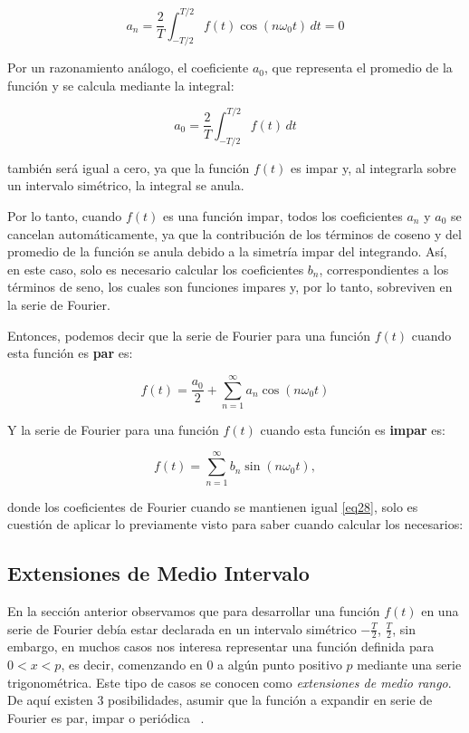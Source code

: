 \[
a_n = \frac{2}{T} \int_{-T/2}^{T/2} f(t) \cos(n \omega_0 t) \, dt = 0
\]

Por un razonamiento análogo, el coeficiente \( a_0 \), que representa el promedio de la función y se calcula mediante la integral:

\[
a_0 = \frac{2}{T} \int_{-T/2}^{T/2} f(t) \, dt
\]

también será igual a cero, ya que la función \( f(t) \) es impar y, al integrarla sobre un intervalo simétrico, la integral se anula.

Por lo tanto, cuando \( f(t) \) es una función impar, todos los coeficientes \( a_n \) y \( a_0 \) se cancelan automáticamente, ya que la contribución de los términos de coseno y del promedio de la función se anula debido a la simetría impar del integrando. Así, en este caso, solo es necesario calcular los coeficientes \( b_n \), correspondientes a los términos de seno, los cuales son funciones impares y, por lo tanto, sobreviven en la serie de Fourier. \newline

Entonces, podemos decir que la serie de Fourier para una función $f(t)$ cuando esta función es \textbf{par} es:

\begin{equation}\label{eq30}
	f(t) = \frac{a_0}{2} + \sum_{n=1}^{\infty} a_n \cos(n\omega_0 t)
\end{equation}

Y la serie de Fourier para una función $f(t)$ cuando esta función es \textbf{impar} es:

\begin{equation}\label{eq31}
	f(t) =\sum_{n=1}^{\infty}  b_n \sin(n\omega_0 t),
\end{equation}

donde los coeficientes de Fourier cuando se mantienen igual \ref{eq28}, solo es cuestión de aplicar lo previamente visto para saber cuando calcular los necesarios:


\subsection{Extensiones de Medio Intervalo}
En la sección anterior observamos que para desarrollar una función $f(t)$ en una serie de Fourier debía estar declarada en un intervalo simétrico $-\frac{T}{2}$, $\frac{T}{2}$, sin embargo, en muchos casos nos interesa representar una función definida para $0 < x < p$, es decir, comenzando en 0 a algún punto positivo $p$ mediante una serie trigonométrica. Este tipo de casos se conocen como \textit{extensiones de medio rango}. De aquí existen 3 posibilidades, asumir que la función a expandir en serie de Fourier es par, impar o periódica ~\cite{fourierCruzFierro}. 

